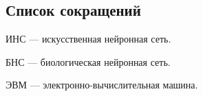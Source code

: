 \begin{center}
\section*{Список сокращений}
\end{center}

ИНС --- искусственная нейронная сеть.

БНС --- биологическая нейронная сеть.

ЭВМ --- электронно-вычислительная машина.


\newpage